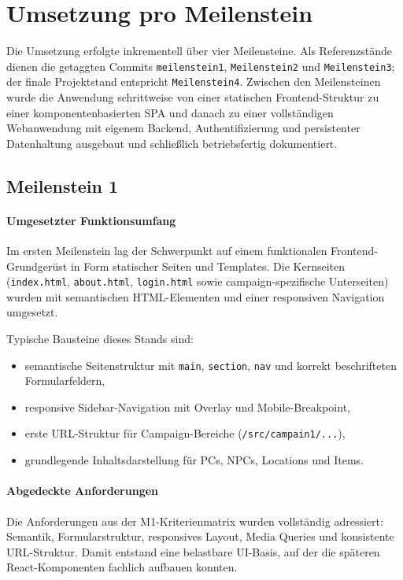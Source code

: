 \section{Umsetzung pro Meilenstein}

Die Umsetzung erfolgte inkrementell über vier Meilensteine.
Als Referenzstände dienen die getaggten Commits
\texttt{meilenstein1}, \texttt{Meilenstein2} und \texttt{Meilenstein3}; der
finale Projektstand entspricht \texttt{Meilenstein4}.
Zwischen den Meilensteinen wurde die Anwendung schrittweise von einer
statischen Frontend-Struktur zu einer komponentenbasierten SPA und danach zu
einer vollständigen Webanwendung mit eigenem Backend, Authentifizierung und
persistenter Datenhaltung ausgebaut und schließlich betriebsfertig dokumentiert.

\subsection{Meilenstein 1}

\paragraph{Umgesetzter Funktionsumfang}
Im ersten Meilenstein lag der Schwerpunkt auf einem funktionalen
Frontend-Grundgerüst in Form statischer Seiten und Templates.
Die Kernseiten (\texttt{index.html}, \texttt{about.html}, \texttt{login.html}
sowie campaign-spezifische Unterseiten) wurden mit semantischen HTML-Elementen
und einer responsiven Navigation umgesetzt.

Typische Bausteine dieses Stands sind:
\begin{itemize}
  \item semantische Seitenstruktur mit \texttt{main}, \texttt{section},
  \texttt{nav} und korrekt beschrifteten Formularfeldern,
  \item responsive Sidebar-Navigation mit Overlay und Mobile-Breakpoint,
  \item erste URL-Struktur für Campaign-Bereiche
  (\texttt{/src/campain1/...}),
  \item grundlegende Inhaltsdarstellung für PCs, NPCs, Locations und Items.
\end{itemize}

\paragraph{Abgedeckte Anforderungen}
Die Anforderungen aus der M1-Kriterienmatrix wurden vollständig adressiert:
Semantik, Formularstruktur, responsives Layout, Media Queries und konsistente
URL-Struktur.
Damit entstand eine belastbare UI-Basis, auf der die späteren
React-Komponenten fachlich aufbauen konnten.

